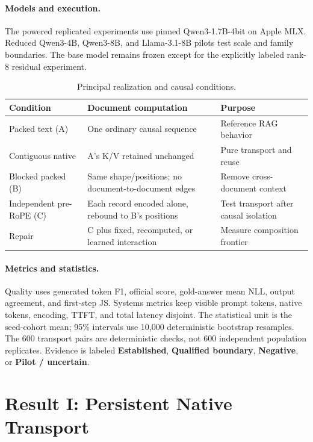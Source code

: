 \documentclass[11pt]{article}
\newcommand{\established}{\textbf{Established}}
\newcommand{\qualified}{\textbf{Qualified boundary}}
\newcommand{\negative}{\textbf{Negative}}
\newcommand{\pilot}{\textbf{Pilot / uncertain}}
\begin{document}
\paragraph{Models and execution.}
The powered replicated experiments use pinned Qwen3-1.7B-4bit on Apple MLX.
Reduced Qwen3-4B, Qwen3-8B, and Llama-3.1-8B pilots test scale and family
boundaries. The base model remains frozen except for the explicitly labeled
rank-8 residual experiment.

\begin{table}[t]
\centering
\caption{Principal realization and causal conditions.}
\label{tab:conditions}
\small
\begin{tabular}{p{.19\linewidth}p{.34\linewidth}p{.35\linewidth}}
\toprule
Condition & Document computation & Purpose \\
\midrule
Packed text (A) & One ordinary causal sequence & Reference RAG behavior \\
Contiguous native & A's K/V retained unchanged & Pure transport and reuse \\
Blocked packed (B) & Same shape/positions; no document-to-document edges & Remove cross-document context \\
Independent pre-RoPE (C) & Each record encoded alone, rebound to B's positions & Test transport after causal isolation \\
Repair & C plus fixed, recomputed, or learned interaction & Measure composition frontier \\
\bottomrule
\end{tabular}
\end{table}

\paragraph{Metrics and statistics.}
Quality uses generated token F1, official score, gold-answer mean NLL, output
agreement, and first-step JS. Systems metrics keep visible prompt tokens,
native tokens, encoding, TTFT, and total latency disjoint. The statistical unit
is the seed-cohort mean; 95\% intervals use 10,000 deterministic bootstrap
resamples. The 600 transport pairs are deterministic checks, not 600
independent population replicates. Evidence is labeled \established,
\qualified, \negative, or \pilot.

\section{Result I: Persistent Native Transport}
\label{sec:transport}
\end{document}
